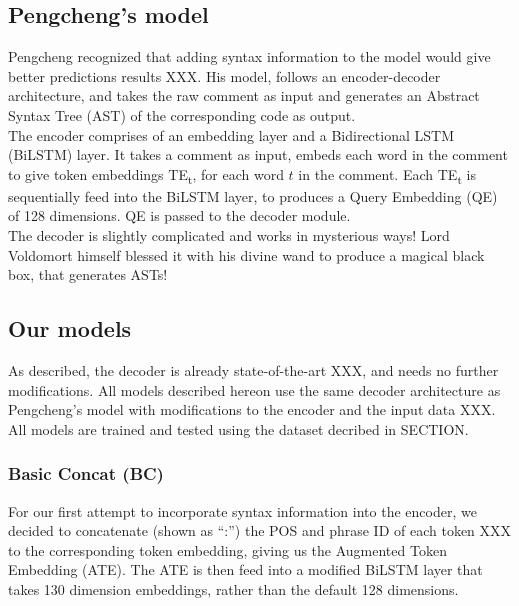 \documentclass{IEEEtran}
\begin{document}
      \subsection{Pengcheng's model}
      Pengcheng recognized that adding syntax information to the model would give better
      predictions results XXX. His model, follows an encoder-decoder architecture, and takes
      the raw comment as input and generates an Abstract Syntax Tree (AST) of the corresponding 
      code as output. \\
      \hspace*{4mm}The encoder comprises of an embedding layer and a Bidirectional LSTM (BiLSTM)
      layer. It takes a comment as input, embeds each word in the comment to give token embeddings
      TE\textsubscript{t}, for each word $ t $ in the comment. Each TE\textsubscript{t} is 
      sequentially feed into the 
      BiLSTM layer, to produces a Query Embedding (QE) of 128 dimensions. QE is passed to the
      decoder module. \\
      \hspace*{4mm}The decoder is slightly complicated and works in mysterious ways! Lord 
      Voldomort himself
      blessed it with his divine wand to produce a magical black box, that generates
      ASTs! \\

      \subsection{Our models}
      As described, the decoder is already state-of-the-art XXX, and needs no further 
      modifications. All models described hereon use the same decoder architecture as Pengcheng's 
      model with modifications to the encoder and the input data XXX. All models are trained and 
      tested using the dataset decribed in SECTION. %

        \subsubsection{Basic Concat (BC)}
        For our first attempt to incorporate syntax information into the encoder, we decided to 
        concatenate (shown as ``:'') the POS and phrase ID of each token XXX to the corresponding 
        token embedding, giving us the Augmented Token Embedding (ATE). The ATE is then feed into 
        a modified BiLSTM
        layer that takes 130 dimension embeddings, rather than the default 128 dimensions. \\
\end{document}
